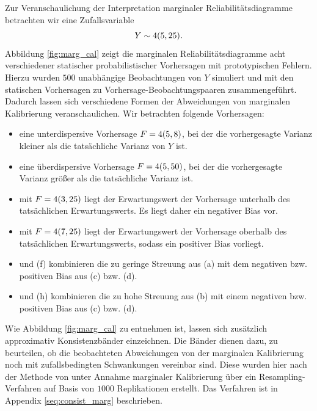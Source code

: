 \begin{bsp} \label{bsp:marg_cal}
Zur Veranschaulichung der Interpretation marginaler Reliabilitätsdiagramme betrachten wir eine Zufallsvariable
\[
Y \sim 4(5,25).
\]
Abbildung \ref{fig:marg_cal} zeigt die marginalen Reliabilitätsdiagramme acht verschiedener statischer probabilistischer Vorhersagen mit prototypischen Fehlern. Hierzu wurden $500$ unabhängige Beobachtungen von $Y$ simuliert und mit den statischen Vorhersagen zu Vorhersage-Beobachtungspaaren zusammengeführt. Dadurch lassen sich verschiedene Formen der Abweichungen von marginalen Kalibrierung veranschaulichen. Wir betrachten folgende Vorhersagen:
\begin{itemize}
\item[(a)] eine unterdispersive Vorhersage $F=4(5,8)$, bei der die vorhergesagte Varianz kleiner als die tatsächliche Varianz von $Y$ ist.

\item[(b)] eine überdispersive Vorhersage $F=4(5,50)$, bei der die vorhergesagte Varianz größer als die tatsächliche Varianz ist.

\item[(c)] mit $F=4(3,25)$ liegt der Erwartungswert der Vorhersage unterhalb des tatsächlichen Erwartungswerts. Es liegt daher ein negativer Bias vor.

\item[(d)] mit $F=4(7,25)$ liegt der Erwartungswert der Vorhersage oberhalb des tatsächlichen Erwartungswerts, sodass ein positiver Bias vorliegt.

\item[(e)] und (f) kombinieren die zu geringe Streuung aus (a) mit dem negativen bzw. positiven Bias aus (c) bzw. (d).

\item[(g)] und (h) kombinieren die zu hohe Streuung aus (b) mit einem negativen bzw. positiven Bias aus (c) bzw. (d).
\end{itemize}
Wie Abbildung \ref{fig:marg_cal} zu entnehmen ist, lassen sich zusätzlich approximativ Konsistenzbänder einzeichnen. Die Bänder dienen dazu, zu beurteilen, ob die beobachteten Abweichungen von der marginalen Kalibrierung noch mit zufallsbedingten Schwankungen vereinbar sind. Diese wurden hier nach der Methode von \textcite{gneiting2023regression} unter Annahme marginaler Kalibrierung über ein Resampling-Verfahren auf Basis von $1000$ Replikationen erstellt. Das Verfahren ist in Appendix \ref{seq:consist_marg} beschrieben.
\end{bsp}

